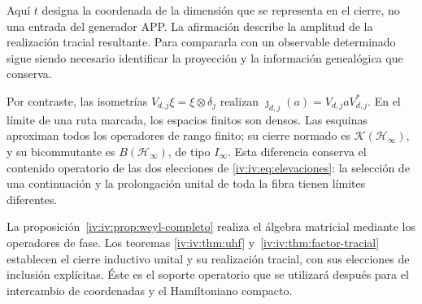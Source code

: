 Aquí \(t\) designa la coordenada de la dimensión que se representa
en el cierre, no una entrada del generador APP. La afirmación
describe la amplitud de la realización tracial resultante. Para
compararla con un observable determinado sigue siendo necesario
identificar la proyección y la información genealógica que conserva.

Por contraste, las isometrías
\(V_{d,j}\xi=\xi\otimes\delta_j\) realizan
\(\jmath_{d,j}(a)=V_{d,j}aV_{d,j}^*\). En el límite de una
ruta marcada, los espacios finitos son densos. Las esquinas
aproximan todos los operadores de rango finito; su cierre normado
es \(\mathcal K(\mathcal H_\infty)\), y su bicommutante es
\(B(\mathcal H_\infty)\), de tipo \(I_\infty\). Esta
diferencia conserva el contenido operatorio de las dos elecciones
de \eqref{iv:iv:eq:elevaciones}: la selección de una continuación y
la prolongación unital de toda la fibra tienen límites diferentes.

La proposición~\ref{iv:iv:prop:weyl-completo} realiza el álgebra
matricial mediante los operadores de fase. Los teoremas
\ref{iv:iv:thm:uhf} y~\ref{iv:iv:thm:factor-tracial} establecen el cierre
inductivo unital y su realización tracial, con sus elecciones de
inclusión explícitas. Éste es el soporte operatorio que se utilizará
después para el intercambio de coordenadas y el Hamiltoniano compacto.
